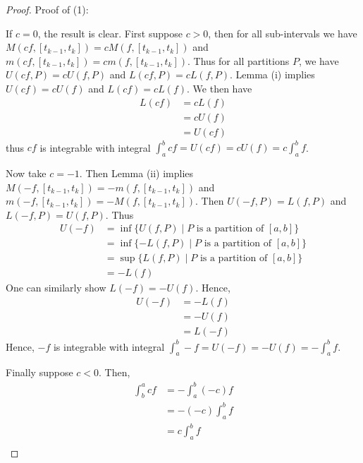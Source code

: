 \documentclass{article}
\begin{document}
  \begin{proof}
    Proof of (1):

    If $c = 0$, the result is clear. First suppose $c > 0$, then for all sub-intervals we have $M(cf, [t_{k-1}, t_k]) = cM(f, [t_{k-1}, t_k])$ and $m(cf, [t_{k-1}, t_k]) = cm(f, [t_{k-1}, t_k])$. Thus for all partitions $P$, we have $U(cf, P) = cU(f, P)$ and $L(cf, P) = cL(f, P)$. Lemma (i) implies $U(cf) = cU(f)$ and $L(cf) = cL(f)$. We then have
    \begin{align*}
      L(cf) &= cL(f)\\
      &= cU(f) \tag{$f$ is integrable}\\
      &= U(cf)
    \end{align*}
    thus $cf$ is integrable with integral $\int_a^b cf = U(cf) = cU(f) = c\int_a^b f$.

    Now take $c = -1$. Then Lemma (ii) implies $M(-f, [t_{k-1}, t_k]) = -m(f, [t_{k-1}, t_k])$ and $m(-f, [t_{k-1}, t_k]) = -M(f, [t_{k-1}, t_k])$. Then $U(-f, P) = L(f, P)$ and $L(-f, P) = U(f, P)$. Thus
    \begin{align*}
      U(-f) &= \inf\{U(f, P) \mid P \text{ is a partition of } [a, b]\}\\
      &= \inf\{-L(f, P) \mid P \text{ is a partition of } [a, b]\}\\
      &= \sup\{L(f, P) \mid P \text{ is a partition of } [a, b]\}\\
      &= -L(f)
    \end{align*}
    One can similarly show $L(-f) = -U(f)$. Hence,
    \begin{align*}
      U(-f) &= -L(f)\\
      &= -U(f)\\
      &= L(-f)
    \end{align*}
    Hence, $-f$ is integrable with integral $\int_a^b -f = U(-f) = -U(f) = -\int_a^b f$.

    Finally suppose $c < 0$. Then,
    \begin{align*}
      \int_b^a cf &= -\int_a^b (-c)f\\
      &= -(-c)\int_a^b f\\
      &= c\int_a^b f\\
    \end{align*}
  \end{proof}
\end{document}
